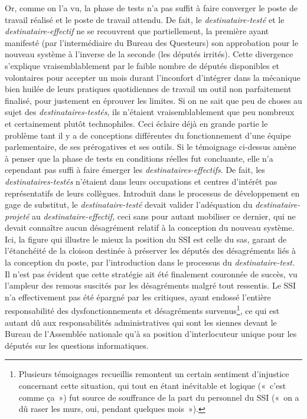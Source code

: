 \documentclass{FramateX}
\begin{document}
\begin{refsection}
Or, comme on l'a vu, la phase de tests n'a pas suffit à faire converger
le poste de travail réalisé et le poste de travail attendu. De fait, le
\textit{destinataire-testé} et le \textit{destinataire-effectif }ne se
recouvrent que partiellement, la première ayant manifesté (par
l'intermédiaire du Bureau des Questeurs) son approbation pour le
nouveau système à l'inverse de la seconde (les députés irrités). Cette
divergence s'explique vraisemblablement par le faible nombre de députés
disponibles et volontaires pour accepter un mois durant l'inconfort
d'intégrer dans la mécanique bien huilée de leurs pratiques
quotidiennes de travail un outil non parfaitement finalisé, pour
justement en éprouver les limites. Si on ne sait que peu de choses au
sujet des \textit{destinataires-testés}, ils n'étaient
vraisemblablement que peu nombreux et certainement plutôt technophiles.
Ceci éclaire déjà en grande partie le problème tant il y a de
conceptions différentes du fonctionnement d'une équipe parlementaire,
de ses prérogatives et ses outils. Si le témoignage ci-dessus amène à
penser que la phase de tests en conditions réelles fut concluante, elle
n'a cependant pas suffi à faire émerger les
\textit{destinataires-effectifs}. De fait, les
\textit{destinataires}\textit{{}-testés} n'étaient dans leurs
occupations et centres d'intérêt pas représentatifs de leurs collègues.
Introduit dans le processus de développement en gage de substitut,
le\textit{ destinataire}\textit{{}-testé} devait valider l'adéquation
du \textit{destinataire-projeté} au \textit{destinataire-effectif,}
ceci sans pour autant mobiliser ce dernier, qui ne devait connaître
aucun désagrément relatif à la conception du nouveau système. Ici, la
figure qui illustre le mieux la position du SSI est celle du sas,
garant de l'étanchéité de la cloison destinée à préserver les députés
des désagréments liés à la conception du poste, par l'introduction dans
le processus du \textit{destinataire}\textit{{}-test}\textit{. }Il
n'est pas évident que cette stratégie ait été finalement couronnée de
succès, vu l'ampleur des remous suscités par les désagréments malgré
tout ressentis. Le SSI n'a effectivement pas été épargné par les
critiques, ayant endossé l'entière responsabilité des
dysfonctionnements et désagréments survenus\footnote{Plusieurs
témoignages recueillis remontent un certain sentiment d'injustice
concernant cette situation, qui tout en étant inévitable et logique
(«~c'est comme ça~») fut source de souffrance de la part du personnel
du SSI («~on a dû raser les murs, oui, pendant quelques mois~»).}, ce
qui est autant dû aux responsabilités administratives qui sont les
siennes devant le Bureau de l'Assemblée nationale qu'à sa position
d'interlocuteur unique pour les députés sur les questions
informatiques.


\end{refsection}
\end{document}
